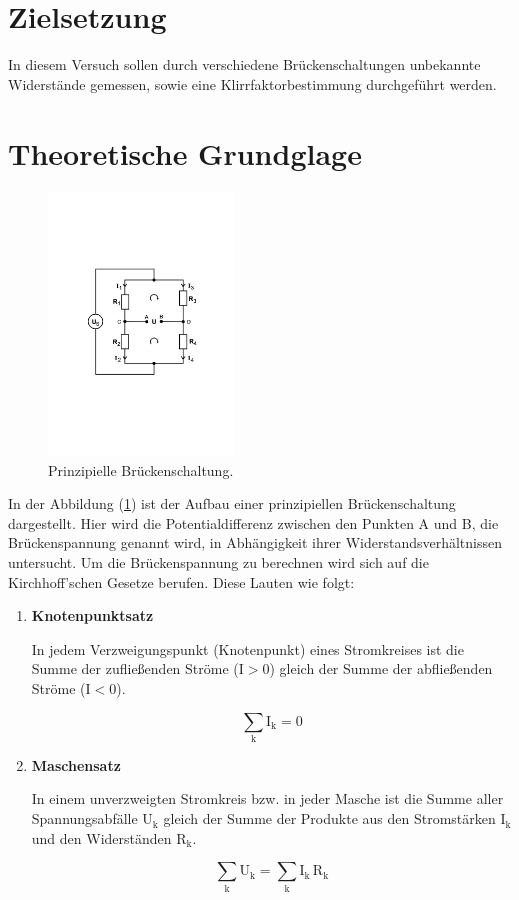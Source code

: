 \section{Zielsetzung}

In diesem Versuch sollen durch verschiedene Brückenschaltungen unbekannte Widerstände gemessen, 
sowie eine Klirrfaktorbestimmung durchgeführt werden.

\section{Theoretische Grundglage}

\begin{figure}
            \centering
               \includegraphics[height=7cm]{prinz.pdf}
               \caption{Prinzipielle Brückenschaltung.}
               \label{fig:prinz}
        \end{figure}

\noindent 
In der Abbildung (\ref{fig:prinz}) ist der Aufbau einer prinzipiellen Brückenschaltung dargestellt.
Hier wird die Potentialdifferenz zwischen den Punkten A und B, die Brückenspannung genannt wird, in Abhängigkeit ihrer Widerstandsverhältnissen untersucht.
Um die Brückenspannung zu berechnen wird sich auf die Kirchhoff'schen Gesetze berufen.
Diese Lauten wie folgt:

\noindent
\begin{enumerate}
\item \textbf{Knotenpunktsatz}

In jedem Verzweigungspunkt (Knotenpunkt) eines Stromkreises ist die Summe der zufließenden Ströme ($\text{I}>0$) gleich der Summe der abfließenden Ströme ($\text{I}<0$).

\begin{equation}
\sum_\text{k} \text{I}_\text{k} = 0
\label{eqn:knotenpunktsatz}
\end{equation}

\item \textbf{Maschensatz}

In einem unverzweigten Stromkreis bzw. in jeder Masche ist die Summe aller Spannungsabfälle $\text{U}_\text{k}$ 
gleich der Summe der Produkte aus den Stromstärken $\text{I}_\text{k}$ und den Widerständen $\text{R}_\text{k}$.

\begin{equation}
\sum_\text{k} \text{U}_\text{k} = \sum_\text{k} \text{I}_\text{k} \, \text{R}_\text{k}
\label{eqn:maschensatz}
\end{equation}
\end{enumerate}

